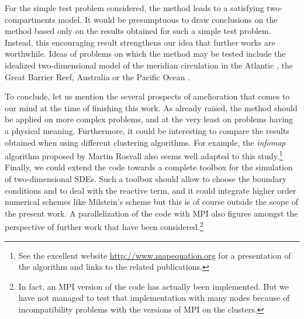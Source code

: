 For the simple test problem considered, the method leads to a satisfying two-compartments model. It would be presumptuous to draw conclusions on the method based only on the results obtained for such a simple test problem. Instead, this encouraging result strengthens our idea that further works are worthwhile. Ideas of problems on which the method may be tested include the idealized two-dimensional model of the meridian circulation in the Atlantic \cite{deleersnijder2006overturner}, the Great Barrier Reef, Australia \cite{thomas2014numerical} or the Pacific Ocean \cite{shah2017tracing}.

To conclude, let us mention the several prospects of amelioration that comes to our mind at the time of finishing this work. As already raised, the method should be applied on more complex problems, and at the very least on problems having a physical meaning. Furthermore, it could be interesting to compare the results obtained when using different clustering algorithms. For example, the \textit{infomap} algorithm proposed by Martin Rosvall also seems well adapted to this study.\footnote{See the excellent website \url{http://www.mapequation.org} for a presentation of the algorithm and links to the related publications.} Finally, we could extend the \Cpp code towards a complete toolbox for the simulation of two-dimensional SDEs. Such a toolbox should allow to choose the boundary conditions and to deal with the reactive term, and it could integrate higher order numerical schemes like Milstein's scheme but this is of course outside the scope of the present work. A parallelization of the code with MPI also figures amongst the perspective of further work that have been considered.\footnote{In fact, an MPI version of the code has actually been implemented. But we have not managed to test that implementation with many nodes because of incompatibility problems with the versions of MPI on the clusters.}

